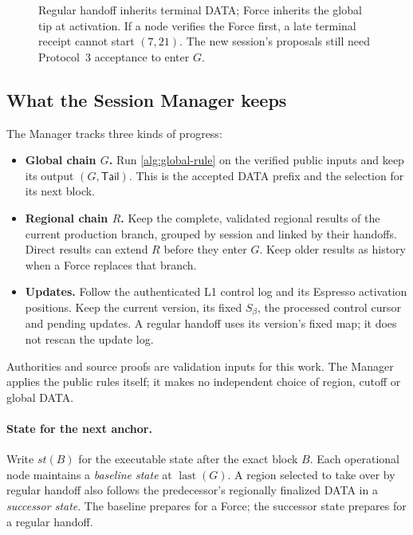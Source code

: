 \documentclass[11pt,a4paper]{article}
\newcommand{\defterm}[1]{\textcolor{rrBlue}{\textit{#1}}}
\begin{document}
\begin{figure}[tbp]\centering

\caption{Regular handoff inherits terminal DATA; Force inherits the global
tip at activation. If a node verifies the Force first, a late terminal
receipt cannot start $(7,21)$. The new session's proposals still need
Protocol~3 acceptance to enter $G$.}
\label{fig:concurrent-handoffs}
\end{figure}

\subsection{What the Session Manager keeps}
\label{sec:session-manager}
\label{sec:runtime-modules}
The Manager tracks three kinds of progress:
\begin{itemize}
\item \textbf{Global chain $G$.} Run \cref{alg:global-rule} on the
verified public inputs and keep its output $(G,\mathsf{Tail})$.
This is the accepted DATA prefix and the selection for its next block.
\item \textbf{Regional chain $R$.} Keep the complete, validated regional
results of the current production branch, grouped by session and linked
by their handoffs. Direct results can extend $R$ before they enter $G$.
Keep older results as history when a Force replaces that branch.
\item \textbf{Updates.} Follow the authenticated L1 control log and its
Espresso activation positions. Keep the current version, its fixed
$S_\beta$, the processed control cursor and pending updates. A regular
handoff uses its version's fixed map; it does not rescan the update log.
\end{itemize}
Authorities and source proofs are validation inputs for this work.
The Manager applies the public rules itself; it makes no independent
choice of region, cutoff or global DATA.

\paragraph{State for the next anchor.}
Write $\mathit{st}(B)$ for the executable state after the exact block
$B$. Each operational node maintains a \defterm{baseline state} at
$\operatorname{last}(G)$. A region selected to take over by regular
handoff also follows the predecessor's regionally finalized DATA in a
\defterm{successor state}. The baseline prepares for a Force; the
successor state prepares for a regular handoff.
\end{document}
